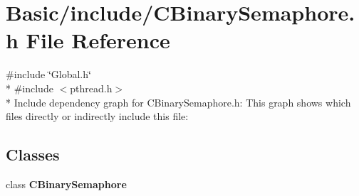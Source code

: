 \section{Basic/include/\-C\-Binary\-Semaphore.h File Reference}
\label{CBinarySemaphore_8h}
{\ttfamily \#include \char`\"{}Global.\-h\char`\"{}}\\*
{\ttfamily \#include $<$pthread.\-h$>$}\\*
Include dependency graph for C\-Binary\-Semaphore.\-h\-:
This graph shows which files directly or indirectly include this file\-:
\subsection*{Classes}
\begin{DoxyCompactItemize}
\item 
class {\bf C\-Binary\-Semaphore}
\end{DoxyCompactItemize}
